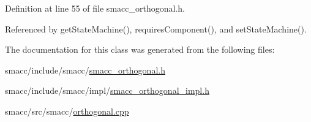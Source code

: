 Definition at line 55 of file smacc\+\_\+orthogonal.\+h.



Referenced by get\+State\+Machine(), requires\+Component(), and set\+State\+Machine().



The documentation for this class was generated from the following files\+:\begin{DoxyCompactItemize}
\item 
smacc/include/smacc/\hyperlink{smacc__orthogonal_8h}{smacc\+\_\+orthogonal.\+h}\item 
smacc/include/smacc/impl/\hyperlink{smacc__orthogonal__impl_8h}{smacc\+\_\+orthogonal\+\_\+impl.\+h}\item 
smacc/src/smacc/\hyperlink{orthogonal_8cpp}{orthogonal.\+cpp}\end{DoxyCompactItemize}
